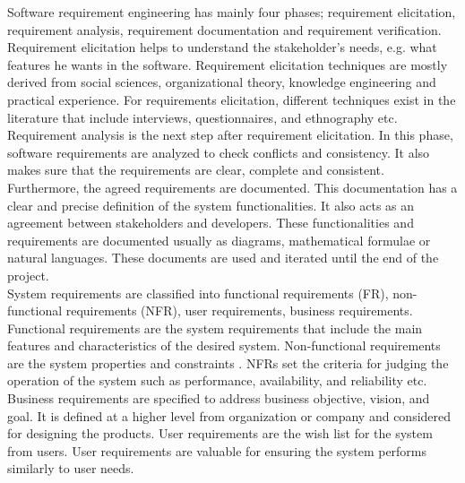 	 Software requirement engineering has mainly four phases; requirement elicitation, requirement
analysis, requirement documentation and requirement verification\cite{Kotonya:1998}. Requirement elicitation
\cite {Coughlan:2002} \cite {Zowghi2005}  helps to understand the stakeholder's needs, e.g. what features he wants in the software.
Requirement elicitation techniques are mostly derived from social sciences, organizational
theory, knowledge engineering and practical experience. For requirements elicitation, different
techniques exist in the literature that include interviews, questionnaires, and ethnography etc.
Requirement analysis \cite{Nuseibeh:2000} is the next step after requirement elicitation. In this phase, software
requirements are analyzed to check conflicts and consistency. It also makes
sure that the requirements are clear, complete and consistent. Furthermore, the agreed
requirements are documented. This documentation has a clear and precise definition of the
system functionalities. It also acts as an agreement between stakeholders and developers. These
functionalities and requirements are documented usually as diagrams, mathematical formulae
or natural languages. These documents are used and iterated until the end of the project.\\

	System requirements are classified into functional requirements (FR), non-functional requirements (NFR), user requirements, business
 requirements. Functional requirements are the system requirements that include the main
features and characteristics of the desired system. Non-functional requirements are the system
properties and constraints \cite{Davis:1993} \cite{Glinz}. NFRs set the criteria for judging the operation of the system such as performance, availability, and reliability etc. Business requirements are specified to address business objective, vision, and goal. It is defined at a higher level from organization or company and considered for designing the products. User requirements are the wish list for the system from users. User requirements are valuable for ensuring the system performs similarly to user needs.\\

